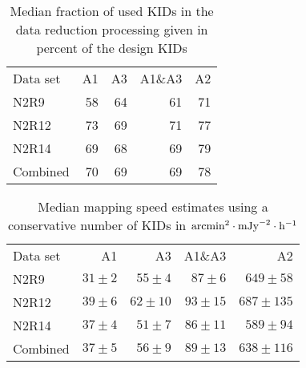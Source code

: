  
\begin{table}[!htbp]
  \centering
  \caption[]{Median fraction of used KIDs in the data reduction processing given in percent of the design KIDs}
  \label{tab:eta_used}
  \begin{tabular}{lrrrr}
    \hline\hline
    \noalign{\smallskip}
    Data set   & A1      &   A3    &   A1\&A3 &    A2 \\
    \noalign{\smallskip}
    \hline
    \noalign{\smallskip}
    N2R9     & 58 &  64  & 61  & 71 \\
    N2R12    & 73 &  69  & 71  & 77 \\
    N2R14    & 69 &  68  & 69  & 79 \\
    Combined & 70 &  69  & 69  & 78 \\
    \hline
  \end{tabular}
\end{table}


\begin{table}[!htbp]
  \centering
  \caption[]{Median mapping speed estimates using a conservative number of KIDs in $\rm{arcmin}^2\cdot\rm{mJy}^{-2}\cdot\rm{h}^{-1}$}
  \label{tab:eta_used}
  \begin{tabular}{lrrrr}
    \hline\hline
    \noalign{\smallskip}
    Data set   & A1      &   A3    &   A1\&A3 &    A2 \\
    \noalign{\smallskip}
    \hline
    \noalign{\smallskip}
    N2R9     & $31 \pm 2$ &  $55 \pm 4$  & $87 \pm 6$   & $649 \pm 58$ \\
    N2R12    & $39 \pm 6$ &  $62 \pm 10$ & $93 \pm 15$  & $687 \pm 135$ \\
    N2R14    & $37 \pm 4$ &  $51 \pm 7$  & $86 \pm 11$  & $589 \pm 94$ \\
    Combined & $37 \pm 5$ &  $56 \pm 9$  & $89 \pm 13$  & $638 \pm 116$ \\
    \hline
  \end{tabular}
\end{table}
